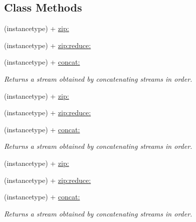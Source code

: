 \subsection*{Class Methods}
\begin{DoxyCompactItemize}
\item 
(instancetype) + \mbox{\hyperlink{category_r_a_c_stream_07_operations_08_a90ef5f217dc285dc831cc0d45166a529}{zip\+:}}
\item 
(instancetype) + \mbox{\hyperlink{category_r_a_c_stream_07_operations_08_aba7b1d8c9ac130afad52b0baca8ae016}{zip\+:reduce\+:}}
\item 
\mbox{\label{category_r_a_c_stream_07_operations_08_ad768270f8b0a075337cf91bec9420530}} 
(instancetype) + \mbox{\hyperlink{category_r_a_c_stream_07_operations_08_ad768270f8b0a075337cf91bec9420530}{concat\+:}}
\begin{DoxyCompactList}\small\item\em Returns a stream obtained by concatenating {\ttfamily streams} in order. \end{DoxyCompactList}\item 
(instancetype) + \mbox{\hyperlink{category_r_a_c_stream_07_operations_08_a90ef5f217dc285dc831cc0d45166a529}{zip\+:}}
\item 
(instancetype) + \mbox{\hyperlink{category_r_a_c_stream_07_operations_08_aba7b1d8c9ac130afad52b0baca8ae016}{zip\+:reduce\+:}}
\item 
\mbox{\label{category_r_a_c_stream_07_operations_08_ad768270f8b0a075337cf91bec9420530}} 
(instancetype) + \mbox{\hyperlink{category_r_a_c_stream_07_operations_08_ad768270f8b0a075337cf91bec9420530}{concat\+:}}
\begin{DoxyCompactList}\small\item\em Returns a stream obtained by concatenating {\ttfamily streams} in order. \end{DoxyCompactList}\item 
(instancetype) + \mbox{\hyperlink{category_r_a_c_stream_07_operations_08_a90ef5f217dc285dc831cc0d45166a529}{zip\+:}}
\item 
(instancetype) + \mbox{\hyperlink{category_r_a_c_stream_07_operations_08_aba7b1d8c9ac130afad52b0baca8ae016}{zip\+:reduce\+:}}
\item 
\mbox{\label{category_r_a_c_stream_07_operations_08_ad768270f8b0a075337cf91bec9420530}} 
(instancetype) + \mbox{\hyperlink{category_r_a_c_stream_07_operations_08_ad768270f8b0a075337cf91bec9420530}{concat\+:}}
\begin{DoxyCompactList}\small\item\em Returns a stream obtained by concatenating {\ttfamily streams} in order. \end{DoxyCompactList}\end{DoxyCompactItemize}


